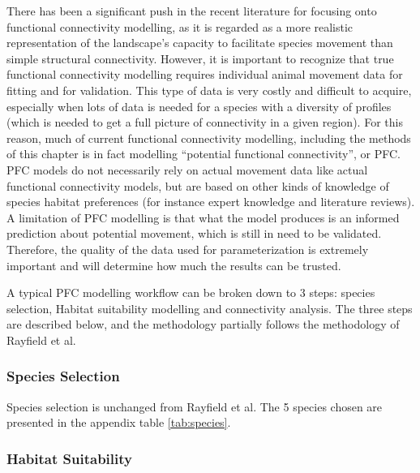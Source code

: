 There has been a significant push in the recent literature for focusing onto functional connectivity modelling, as it is regarded as a more realistic representation of  the landscape’s capacity to facilitate species movement than simple structural connectivity. However, it is important to recognize that true functional connectivity modelling requires individual animal movement data for fitting and for validation. This type of data is very costly and difficult to acquire, especially when lots of data is needed for a species with a diversity of profiles (which is needed to get a full picture of connectivity in a given region). For this reason, much of current functional connectivity modelling, including the methods of this chapter is in fact modelling “potential functional connectivity”, or PFC. PFC models do not necessarily rely on actual movement data like actual functional connectivity models, but are based on other kinds of knowledge of species habitat preferences (for instance expert knowledge and literature reviews). A limitation of PFC modelling is that what the model produces is an informed prediction about potential movement, which is still in need to be validated. Therefore, the quality of the data used for parameterization is extremely important and will determine how much the results can be trusted.

A typical PFC modelling workflow can be broken down to 3 steps: species selection, Habitat suitability modelling and connectivity analysis. The three steps are described below, and the methodology partially follows the methodology of Rayfield et al.\\

\subsubsection{Species Selection}

Species selection is unchanged from Rayfield et al. The 5 species chosen are presented in the appendix table \ref{tab:species}.\\

\subsubsection{Habitat Suitability}

